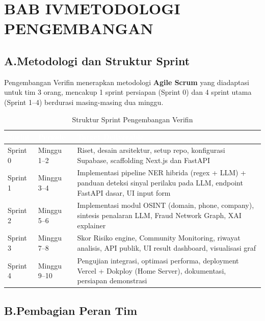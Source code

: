 \documentclass[12pt,a4paper]{article}
\newcommand{\thead}[1]{\textcolor{white}{\textbf{#1}}}
\begin{document}
\section*{BAB IV\quad METODOLOGI PENGEMBANGAN}

\subsection*{A.\quad Metodologi dan Struktur Sprint}

Pengembangan Verifin menerapkan metodologi \textbf{Agile Scrum} yang diadaptasi untuk tim 3 orang, mencakup 1 sprint persiapan (Sprint 0) dan 4 sprint utama (Sprint 1--4) berdurasi masing-masing dua minggu.

\begin{adjustwidth}{0.50cm}{0pt}
\begin{table}[H]
\centering
\caption{Struktur Sprint Pengembangan Verifin}
\label{tab:sprint-structure}
\small
\begin{tabularx}{\linewidth}{@{}p{2.0cm}p{2.6cm}Y@{}}
\toprule
{}\thead{Sprint} & \thead{Periode} & \thead{Target Deliverable} \\
\midrule
{}
Sprint 0 & Minggu 1--2 & Riset, desain arsitektur, setup repo, konfigurasi Supabase, scaffolding Next.js dan FastAPI \\
Sprint 1 & Minggu 3--4 & Implementasi pipeline NER hibrida (regex + LLM) + panduan deteksi sinyal perilaku pada LLM, endpoint FastAPI dasar, UI input form \\
Sprint 2 & Minggu 5--6 & Implementasi modul OSINT (domain, phone, company), sintesis penalaran LLM, Fraud Network Graph, XAI explainer \\
Sprint 3 & Minggu 7--8 & Skor Risiko engine, Community Monitoring, riwayat analisis, API publik, UI result dashboard, visualisasi graf \\
Sprint 4 & Minggu 9--10 & Pengujian integrasi, optimasi performa, deployment Vercel + Dokploy (Home Server), dokumentasi, persiapan demonstrasi \\
\bottomrule
\end{tabularx}
\end{table}
\end{adjustwidth}

\subsection*{B.\quad Pembagian Peran Tim}
\end{document}
